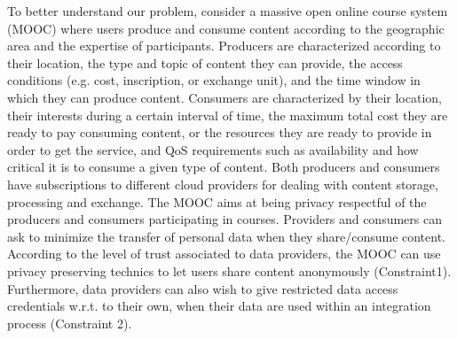  

To better understand our problem, consider a massive open online course system (MOOC) where users produce and consume content according to the geographic area and the expertise of participants. 
Producers are characterized according to their location, the type and topic of  content  they can provide, the access conditions (e.g. cost, inscription, or exchange unit), and the time window in which they can produce content. 
Consumers are characterized by their location, their interests  during a certain interval of time, the maximum total cost they are ready to pay consuming content, or the resources they are ready to provide in order to get the service, and QoS requirements such as availability and how critical it is to consume a given type of content. Both producers and consumers have subscriptions to different cloud providers for dealing with content storage, processing and exchange.
The MOOC  aims at being privacy respectful of the producers and consumers participating in courses.
 Providers  and consumers can ask to minimize the transfer of personal data  when they share/consume content.  According to the level of trust associated to data providers, the MOOC can use privacy preserving technics to let users share content anonymously  (Constraint1). Furthermore,  data providers can  also wish to give restricted data access credentials w.r.t. to their own, when their data are used  within  an integration process (Constraint 2).  
 
